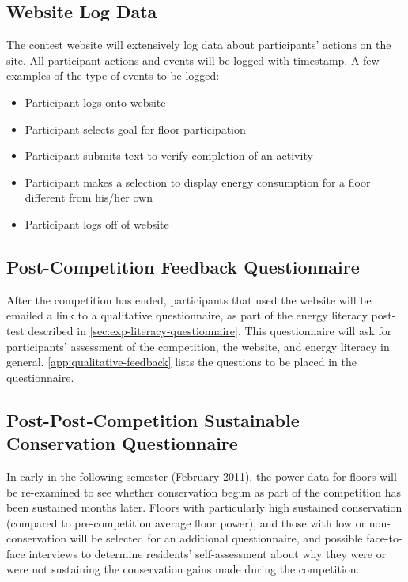 \subsection{Website Log Data}

The contest website will extensively log data about participants' actions on the site. All participant actions and events will be logged with timestamp. A few examples of the type of events to be logged:

\begin{itemize}
\item Participant logs onto website
\item Participant selects goal for floor participation
\item Participant submits text to verify completion of an activity
\item Participant makes a selection to display energy consumption for a floor different from his/her own
\item Participant logs off of website
\end{itemize}

\subsection{Post-Competition Feedback Questionnaire}
\label{sec:post-competition-feedback}
After the competition has ended, participants that used the website will be emailed a link to a qualitative questionnaire, as part of the energy literacy post-test described in \ref{sec:exp-literacy-questionnaire}. This questionnaire will ask for participants' assessment of the competition, the website, and energy literacy in general. \autoref{app:qualitative-feedback} lists the questions to be placed in the questionnaire.

\subsection{Post-Post-Competition Sustainable Conservation Questionnaire}

In early in the following semester (February 2011), the power data for floors will be re-examined to see whether conservation begun as part of the competition has been sustained months later. Floors with particularly high sustained conservation (compared to pre-competition average floor power), and those with low or non-conservation will be selected for an additional questionnaire, and possible face-to-face interviews to determine residents' self-assessment about why they were or were not sustaining the conservation gains made during the competition.

